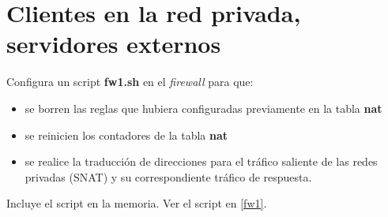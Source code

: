 \documentclass[12pt, a4paper]{report}
\begin{document}
\section{Clientes en la red privada, servidores externos}
Configura un script \textbf{fw1.sh} en el \textit{firewall} para que:
\begin{itemize}
	\item se borren las reglas que hubiera configuradas previamente en la tabla \textbf{nat}
	\item se reinicien los contadores de la tabla \textbf{nat}
	\item se realice la traducción de direcciones para el tráfico saliente de las redes privadas (SNAT) y su
	correspondiente tráfico de respuesta.
\end{itemize}
Incluye el script en la memoria. Ver el script en \ref{fw1}.
\end{document}
